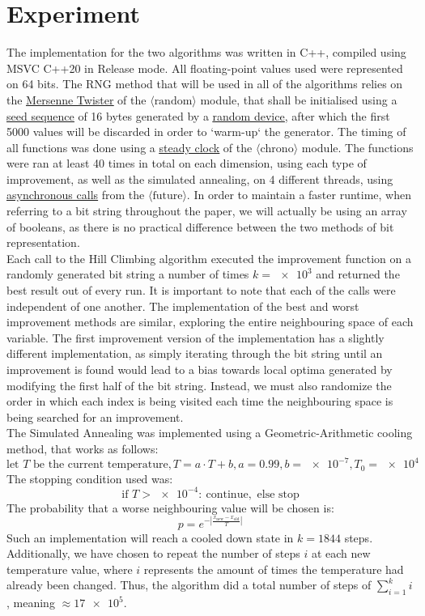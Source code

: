 \documentclass{article}
\newcommand{\euler}{e}
\begin{document}
\section{Experiment}
The implementation for the two algorithms was written in C++, compiled using MSVC C++20 in Release mode. All floating-point values used were represented on 64 bits. The RNG method that will be used in all of the algorithms relies on the \underline{\href{https://cplusplus.com/reference/random/mt19937/}{Mersenne Twister}} of the $\langle\text{random}\rangle$ module, that shall be initialised using a \underline{\href{https://en.cppreference.com/w/cpp/numeric/random/seed_seq}{seed sequence}} of 16 bytes generated by a \underline{\href{https://en.cppreference.com/w/cpp/numeric/random/random_device}{random device}}, after which the first 5000 values will be discarded in order to `warm-up` the generator. The timing of all functions was done using a \underline{\href{https://en.cppreference.com/w/cpp/chrono/steady_clock}{steady clock}} of the $\langle\text{chrono}\rangle$ module. The functions were ran at least 40 times in total on each dimension, using each type of improvement, as well as the simulated annealing, on 4 different threads, using \underline{\href{https://en.cppreference.com/w/cpp/thread/async}{asynchronous calls}} from the $\langle\text{future}\rangle$. In order to maintain a faster runtime, when referring to a bit string throughout the paper, we will actually be using an array of booleans, as there is no practical difference between the two methods of bit representation.\\
Each call to the Hill Climbing algorithm executed the improvement function on a randomly generated bit string a number of times $k = \num{e3}$ and returned the best result out of every run. It is important to note that each of the calls were independent of one another. The implementation of the best and worst improvement methods are similar, exploring the entire neighbouring space of each variable. The first improvement version of the implementation has a slightly different implementation, as simply iterating through the bit string until an improvement is found would lead to a bias towards local optima generated by modifying the first half of the bit string. Instead, we must also randomize the order in which each index is being visited each time the neighbouring space is being searched for an improvement. \\
The Simulated Annealing was implemented using a Geometric-Arithmetic cooling method, that works as follows:
$$ \text{let } T \text{ be the current temperature}, T = a \cdot T + b, a = 0.99, b = \num{e-7}, T_0 = \num{e4} $$
The stopping condition used was:
$$ \text{if } T > \num{e-4}\colon\  \text{continue}, \text{ else stop} $$
The probability that a worse neighbouring value will be chosen is: 
$$p = \euler^{-|\frac{x_{\text{new}} - x_{\text{old}}}{T}|}$$
Such an implementation will reach a cooled down state in $ k = 1844 $ steps. Additionally, we have chosen to repeat the number of steps $i$ at each new temperature value, where $i$ represents the amount of times the temperature had already been changed. Thus, the algorithm did a total number of steps of $ \sum_{i = 1}^k i $, meaning $\approx \num{17e5} $.   
\end{document}
